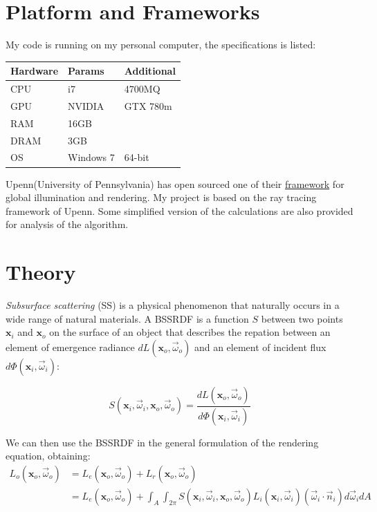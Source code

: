 \documentclass[11pt]{article}
\begin{document}
\section{Platform and Frameworks}
\label{sec:orgheadline3}

My code is running on my personal computer, the specifications is listed:
\begin{center}
\begin{tabular}{lll}
\hline
\hline
Hardware & Params & Additional\\
\hline
CPU & i7 & 4700MQ\\
GPU & NVIDIA & GTX 780m\\
RAM & 16GB & \\
DRAM & 3GB & \\
OS & Windows 7 & 64-bit\\
\hline
\end{tabular}
\end{center}

Upenn(University of Pennsylvania) has open sourced one of their \href{https://cis565-fall-2015.github.io/}{framework}  for 
global illumination and rendering. My project is based on the ray tracing framework
of Upenn. Some simplified version of the calculations are also provided for analysis of the algorithm.

\section{Theory}
\label{sec:orgheadline4}

{\it Subsurface scattering} (SS) is a physical phenomenon that naturally occurs in a wide range of natural materials.
A BSSRDF is a function $S$ between two points $\mathbf{x}_i$ and $\mathbf{x}_o$ on the surface of an object
 that describes the repation between an element of emergence radiance $dL(\mathbf{x}_o, \vec{\omega}_o)$ and an 
element of incident flux $d\Phi(\mathbf{x}_i,\vec{\omega}_i)$:

$$
S(\mathbf{x}_i, \vec{\omega}_i,\mathbf{x}_o, \vec{\omega}_o) = \frac{dL(\mathbf{x}_o, \vec{\omega}_o)}{d\Phi(\mathbf{x}_i,\vec{\omega}_i)}
$$

We can then use the BSSRDF in the general formulation of the rendering equation, obtaining:
\begin{equation}
\label{eq:eq1}
\begin{aligned}
L_o(\mathbf{x}_o, \vec{\omega}_o) &= L_e(\mathbf{x}_o, \vec{\omega}_o) + L_r(\mathbf{x}_o, \vec{\omega}_o) \\
&= L_e(\mathbf{x}_o, \vec{\omega}_o) + \int_A \int_{2\pi} S(\mathbf{x}_i, \vec{\omega}_i,\mathbf{x}_o, \vec{\omega}_o) L_i(\mathbf{x}_i, \vec{\omega}_i)(\vec{\omega}_i \cdot \vec{n}_i) d\vec{\omega}_i dA
\end{aligned}
\end{equation}
\end{document}

